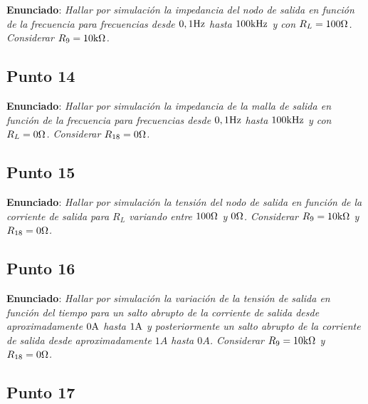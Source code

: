 \textbf{Enunciado}: \textsl{Hallar por simulación la impedancia del nodo de salida en función de la frecuencia para frecuencias desde $0,1 \si[per-mode=symbol]{\hertz}$ hasta $100 \si[per-mode=symbol]{\kilo\hertz}$ y con $R_{L} = 100 \si[per-mode=symbol]{\ohm}$. Considerar $R_{9} = 10 \si[per-mode=symbol]{\kilo\ohm}$.}



\subsection{Punto 14}

\textbf{Enunciado}: \textsl{Hallar por simulación la impedancia de la malla de salida en función de la frecuencia para frecuencias desde $0,1 \si[per-mode=symbol]{\hertz}$ hasta $100 \si[per-mode=symbol]{\kilo\hertz}$ y con  $R_{L} = 0 \si[per-mode=symbol]{\ohm}$. Considerar  $R_{18} = 0 \si[per-mode=symbol]{\ohm}$.}



\subsection{Punto 15}

\textbf{Enunciado}: \textsl{Hallar por simulación la tensión del nodo de salida en función de la corriente de salida para  $R_{L}$ variando entre  $100 \si[per-mode=symbol]{\ohm}$ y $0 \si[per-mode=symbol]{\ohm}$. Considerar $R_{9} = 10 \si[per-mode=symbol]{\kilo\ohm}$ y $R_{18} = 0 \si[per-mode=symbol]{\ohm}$.}




\subsection{Punto 16}

\textbf{Enunciado}: \textsl{Hallar por simulación la variación de la tensión de salida en función del tiempo para un salto abrupto de la corriente de salida desde aproximadamente $0 \si[per-mode=symbol]{\ampere}$ hasta $ 1 \si[per-mode=symbol]{\ampere}$ y posteriormente un salto abrupto de la corriente de salida desde aproximadamente $ 1A$ hasta $0 A$. Considerar $R_{9} = 10 \si[per-mode=symbol]{\kilo\ohm}$ y $R_{18} = 0 \si[per-mode=symbol]{\ohm}$.}



\subsection{Punto 17}

